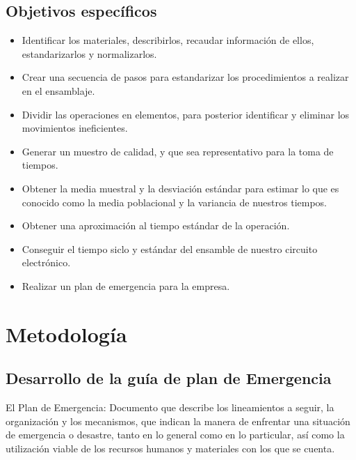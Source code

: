     
    \subsection{Objetivos específicos}
    
    \begin{itemize}
        \item Identificar los materiales, describirlos, recaudar información de ellos, estandarizarlos y normalizarlos.
        \item Crear una secuencia de pasos para estandarizar los procedimientos a realizar en el ensamblaje.
        \item Dividir las operaciones en elementos, para posterior identificar y eliminar los movimientos ineficientes.
        \item Generar un muestro de calidad, y que sea representativo para la toma de tiempos.
        
        \item Obtener la media muestral y la desviación estándar para estimar lo que es conocido como la media poblacional y la variancia de nuestros tiempos.
        \item Obtener una aproximación al tiempo estándar de la operación.
        \item Conseguir el tiempo siclo y estándar del ensamble de nuestro circuito electrónico.
        \item Realizar un plan de emergencia para la empresa.
        
    \end{itemize}
    
    
    \section{Metodología}
    \subsection{Desarrollo de la guía de plan de Emergencia}
    
    El Plan de Emergencia: Documento que describe los lineamientos a seguir, la organización y los mecanismos, que indican la manera de enfrentar una situación de emergencia o desastre, tanto en lo general como en lo particular, así como la utilización viable de los recursos humanos y materiales con los que se cuenta.
